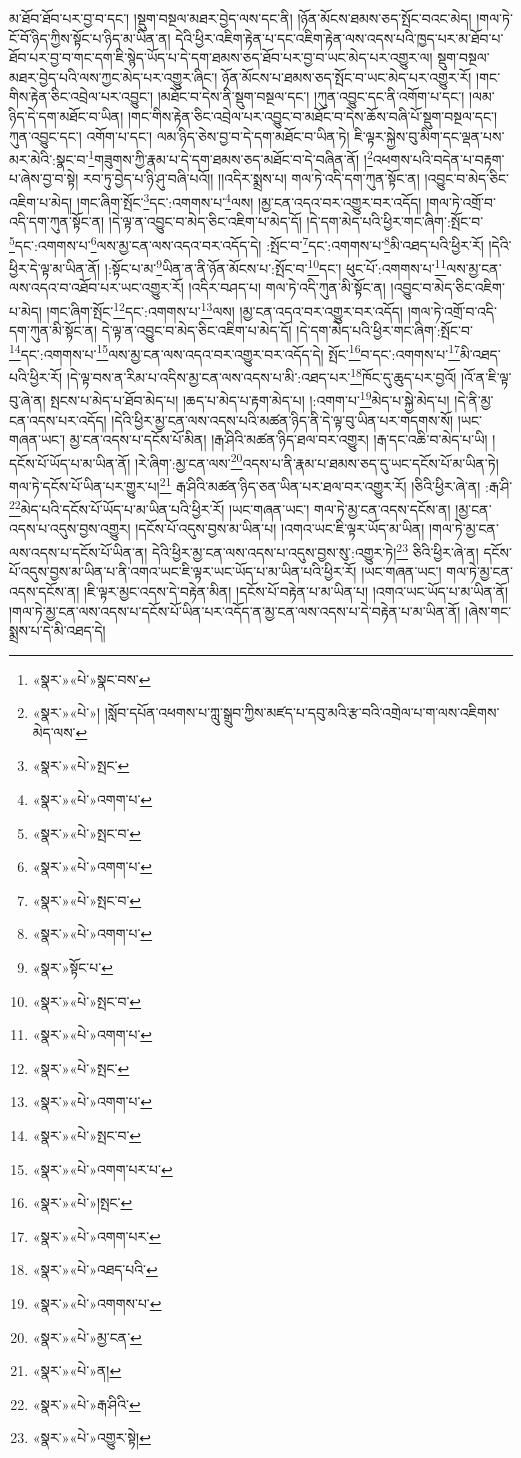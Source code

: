 མ་ཐོབ་ཐོབ་པར་བྱ་བ་དང་། །སྡུག་བསྔལ་མཐར་བྱེད་ལས་དང་ནི། །ཉོན་མོངས་ཐམས་ཅད་སྤོང་བའང་མེད། །གལ་ཏེ་ངོ་བོ་ཉིད་ཀྱིས་སྟོང་པ་ཉིད་མ་ཡིན་ན། དེའི་ཕྱིར་འཇིག་རྟེན་པ་དང་འཇིག་རྟེན་ལས་འདས་པའི་ཁྱད་པར་མ་ཐོབ་པ་ཐོབ་པར་བྱ་བ་གང་དག་ཇི་སྙེད་ཡོད་པ་དེ་དག་ཐམས་ཅད་ཐོབ་པར་བྱ་བ་ཡང་མེད་པར་འགྱུར་ལ། སྡུག་བསྔལ་མཐར་བྱེད་པའི་ལས་ཀྱང་མེད་པར་འགྱུར་ཞིང་། ཉོན་མོངས་པ་ཐམས་ཅད་སྤོང་བ་ཡང་མེད་པར་འགྱུར་རོ། །གང་གིས་རྟེན་ཅིང་འབྲེལ་པར་འབྱུང་། །མཐོང་བ་དེས་ནི་སྡུག་བསྔལ་དང་། །ཀུན་འབྱུང་དང་ནི་འགོག་པ་དང་། །ལམ་ཉིད་དེ་དག་མཐོང་བ་ཡིན། །གང་གིས་རྟེན་ཅིང་འབྲེལ་པར་འབྱུང་བ་མཐོང་བ་དེས་ཆོས་བཞི་པོ་སྡུག་བསྔལ་དང་། ཀུན་འབྱུང་དང་། འགོག་པ་དང་། ལམ་ཉིད་ཅེས་བྱ་བ་དེ་དག་མཐོང་བ་ཡིན་ཏེ། ཇི་ལྟར་སྐྱེས་བུ་མིག་དང་ལྡན་པས་མར་མེའི་:སྣང་བ་\footnote{«སྣར་»«པེ་»སྣང་བས་}གཟུགས་ཀྱི་རྣམ་པ་དེ་དག་ཐམས་ཅད་མཐོང་བ་དེ་བཞིན་ནོ། །\footnote{«སྣར་»«པེ་»། །སློབ་དཔོན་འཕགས་པ་ཀླུ་སྒྲུབ་ཀྱིས་མཛད་པ་དབུ་མའི་རྩ་བའི་འགྲེལ་པ་ག་ལས་འཇིགས་མེད་ལས་}འཕགས་པའི་བདེན་པ་བརྟག་པ་ཞེས་བྱ་བ་སྟེ། རབ་ཏུ་བྱེད་པ་ཉི་ཤུ་བཞི་པའོ།། །།འདིར་སྨྲས་པ། གལ་ཏེ་འདི་དག་ཀུན་སྟོང་ན། །འབྱུང་བ་མེད་ཅིང་འཇིག་པ་མེད། །གང་ཞིག་སྤོང་\footnote{«སྣར་»«པེ་»སྤང་}དང་:འགགས་པ་\footnote{«སྣར་»«པེ་»འགག་པ་}ལས། །མྱ་ངན་འདའ་བར་འགྱུར་བར་འདོད། །གལ་ཏེ་འགྲོ་བ་འདི་དག་ཀུན་སྟོང་ན། །དེ་ལྟ་ན་འབྱུང་བ་མེད་ཅིང་འཇིག་པ་མེད་དོ། །དེ་དག་མེད་པའི་ཕྱིར་གང་ཞིག་:སྤོང་བ་\footnote{«སྣར་»«པེ་»སྤང་བ་}དང་:འགགས་པ་\footnote{«སྣར་»«པེ་»འགག་པ་}ལས་མྱ་ངན་ལས་འདའ་བར་འདོད་དེ། :སྤོང་བ་\footnote{«སྣར་»«པེ་»སྤང་བ་}དང་:འགགས་པ་\footnote{«སྣར་»«པེ་»འགག་པ་}མི་འཐད་པའི་ཕྱིར་རོ། །དེའི་ཕྱིར་དེ་ལྟ་མ་ཡིན་ནོ། །:སྟོང་པ་མ་\footnote{«སྣར་»སྟོང་པ་}ཡིན་ན་ནི་ཉོན་མོངས་པ་:སྤོང་བ་\footnote{«སྣར་»«པེ་»སྤང་བ་}དང་། ཕུང་པོ་:འགགས་པ་\footnote{«སྣར་»«པེ་»འགག་པ་}ལས་མྱ་ངན་ལས་འདའ་བ་འཐོབ་པར་ཡང་འགྱུར་རོ། །འདིར་བཤད་པ། གལ་ཏེ་འདི་ཀུན་མི་སྟོང་ན། །འབྱུང་བ་མེད་ཅིང་འཇིག་པ་མེད། །གང་ཞིག་སྤོང་\footnote{«སྣར་»«པེ་»སྤང་}དང་:འགགས་པ་\footnote{«སྣར་»«པེ་»འགག་པ་}ལས། །མྱ་ངན་འདའ་བར་འགྱུར་བར་འདོད། །གལ་ཏེ་འགྲོ་བ་འདི་དག་ཀུན་མི་སྟོང་ན། དེ་ལྟ་ན་འབྱུང་བ་མེད་ཅིང་འཇིག་པ་མེད་དོ། །དེ་དག་མེད་པའི་ཕྱིར་གང་ཞིག་:སྤོང་བ་\footnote{«སྣར་»«པེ་»སྤང་བ་}དང་:འགགས་པ་\footnote{«སྣར་»«པེ་»འགག་པར་པ་}ལས་མྱ་ངན་ལས་འདའ་བར་འགྱུར་བར་འདོད་དེ། སྤོང་\footnote{«སྣར་»«པེ་»།སྤང་}བ་དང་:འགགས་པ་\footnote{«སྣར་»«པེ་»འགག་པར་}མི་འཐད་པའི་ཕྱིར་རོ། །དེ་ལྟ་བས་ན་རིམ་པ་འདིས་མྱ་ངན་ལས་འདས་པ་མི་:འཐད་པར་\footnote{«སྣར་»«པེ་»འཐད་པའི་}ཁོང་དུ་ཆུད་པར་བྱའོ། །འོ་ན་ཇི་ལྟ་བུ་ཞེ་ན། སྤངས་པ་མེད་པ་ཐོབ་མེད་པ། །ཆད་པ་མེད་པ་རྟག་མེད་པ། །:འགག་པ་\footnote{«སྣར་»«པེ་»འགགས་པ་}མེད་པ་སྐྱེ་མེད་པ། །དེ་ནི་མྱ་ངན་འདས་པར་འདོད། །དེའི་ཕྱིར་མྱ་ངན་ལས་འདས་པའི་མཚན་ཉིད་ནི་དེ་ལྟ་བུ་ཡིན་པར་གདགས་སོ། །ཡང་གཞན་ཡང་། མྱ་ངན་འདས་པ་དངོས་པོ་མིན། །རྒ་ཤིའི་མཚན་ཉིད་ཐལ་བར་འགྱུར། །རྒ་དང་འཆི་བ་མེད་པ་ཡི། །དངོས་པོ་ཡོད་པ་མ་ཡིན་ནོ། །རེ་ཞིག་:མྱ་ངན་ལས་\footnote{«སྣར་»«པེ་»མྱ་ངན་}འདས་པ་ནི་རྣམ་པ་ཐམས་ཅད་དུ་ཡང་དངོས་པོ་མ་ཡིན་ཏེ། གལ་ཏེ་དངོས་པོ་ཡིན་པར་གྱུར་པ།\footnote{«སྣར་»«པེ་»ན།} རྒ་ཤིའི་མཚན་ཉིད་ཅན་ཡིན་པར་ཐལ་བར་འགྱུར་རོ། །ཅིའི་ཕྱིར་ཞེ་ན། :རྒ་ཤི་\footnote{«སྣར་»«པེ་»རྒ་ཤིའི་}མེད་པའི་དངོས་པོ་ཡོད་པ་མ་ཡིན་པའི་ཕྱིར་རོ། །ཡང་གཞན་ཡང་། གལ་ཏེ་མྱ་ངན་འདས་དངོས་ན། །མྱ་ངན་འདས་པ་འདུས་བྱས་འགྱུར། །དངོས་པོ་འདུས་བྱས་མ་ཡིན་པ། །འགའ་ཡང་ཇི་ལྟར་ཡོད་མ་ཡིན། །གལ་ཏེ་མྱ་ངན་ལས་འདས་པ་དངོས་པོ་ཡིན་ན། དེའི་ཕྱིར་མྱ་ངན་ལས་འདས་པ་འདུས་བྱས་སུ་:འགྱུར་ཏེ།\footnote{«སྣར་»«པེ་»འགྱུར་སྟེ།} ཅིའི་ཕྱིར་ཞེ་ན། དངོས་པོ་འདུས་བྱས་མ་ཡིན་པ་ནི་འགའ་ཡང་ཇི་ལྟར་ཡང་ཡོད་པ་མ་ཡིན་པའི་ཕྱིར་རོ། །ཡང་གཞན་ཡང་། གལ་ཏེ་མྱ་ངན་འདས་དངོས་ན། །ཇི་ལྟར་མྱང་འདས་དེ་བརྟེན་མིན། །དངོས་པོ་བརྟེན་པ་མ་ཡིན་པ། །འགའ་ཡང་ཡོད་པ་མ་ཡིན་ནོ། །གལ་ཏེ་མྱ་ངན་ལས་འདས་པ་དངོས་པོ་ཡིན་པར་འདོད་ན་མྱ་ངན་ལས་འདས་པ་དེ་བརྟེན་པ་མ་ཡིན་ནོ། །ཞེས་གང་སྨྲས་པ་དེ་མི་འཐད་དེ། 
